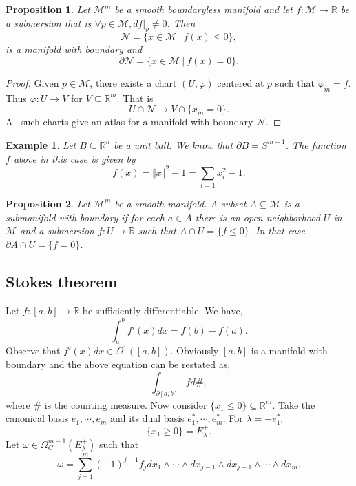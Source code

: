 \documentclass[8pt]{article}
\newtheorem{proposition}{Proposition}[section]
\newtheorem{example}{Example}[section]
\newcommand{\norm}[1]{\Vert #1 \Vert}
\newcommand{\R}[0]{\mathbb{R}}
\newcommand{\M}[0]{\mathcal{M}}
\newcommand{\maniN}[0]{\mathcal{N}}
\newcommand{\sep}[0]{\:|\:}
\begin{document}
\begin{proposition}
  Let $\M^m$ be a smooth boundaryless manifold and let $f:\M\to\R$ be a submersion that is $\forall p\in\M, df|_p\not=0$. Then 
  \begin{equation*}
    \maniN = \{x\in\M\sep f(x)\leq 0\},
  \end{equation*}
  is a manifold with boundary and 
  \begin{equation*}
    \partial\maniN = \{x\in\M\sep f(x) = 0\}.
  \end{equation*}
\end{proposition}

\begin{proof}
  Given $p\in\M$, there exists  a chart $(U,\varphi)$ centered at $p$ such that $\varphi_m = f$. Thus $\varphi:U\to V$ for $V\subseteq\R^m$. That is 
  \begin{equation*}
    U\cap\maniN \to V\cap\{x_m=0\}.
  \end{equation*}
  All such charts give an atlas for a manifold with boundary $\maniN$.
\end{proof}

\begin{example}
  Let $B\subseteq\R^n$ be a unit ball. We know that $\partial B = S^{m-1}$. The function $f$ above in this case is given by 
  \begin{equation*}
    f(x) = \norm{x}^2-1 = \sum_{i=1}x_i^2- 1.
  \end{equation*}
\end{example}

\begin{proposition}
  Let $\M^m$ be a smooth manifold. A subset $A\subseteq \M$ is a submanifold with boundary if for each $a\in A$ there is an open neighborhood $U$ in $\M$ and a submersion $f:U\to\R$ such that $A\cap U = \{f\leq 0\}$. In that case $\partial A\cap U = \{f=0\}$.
\end{proposition}

\subsection{Stokes theorem}

Let $f:[a,b]\to\R$ be sufficiently differentiable. We have,
\begin{equation*}
  \int_a^bf'(x)dx = f(b)-f(a).
\end{equation*}
Observe that $f'(x)dx\in\Omega^1([a,b])$. Obviously $[a,b]$ is a manifold with boundary and the above equation can be restated as,
\begin{equation*}
  \int_{\partial[a,b]}fd\#,
\end{equation*}
where $\#$ is the counting measure. Now consider $\{x_1\leq 0\}\subseteq\R^m$. Take the canonical basis $e_1,\cdots,e_m$ and its dual basis $e_1^*,\cdots,e_m^*$. For $\lambda = -e_1^*$,
\begin{equation*}
  \{x_1\geq 0\} = E_{\lambda}^+.
\end{equation*}
Let $\omega\in\Omega_C^{m-1}(E_\lambda^+)$ such that 
\begin{equation*}
  \omega = \sum_{j=1}^m(-1)^{j-1}f_j dx_1\wedge\cdots\wedge dx_{j-1}\wedge dx_{j+1}\wedge\cdots\wedge dx_m.
\end{equation*}
\end{document}
